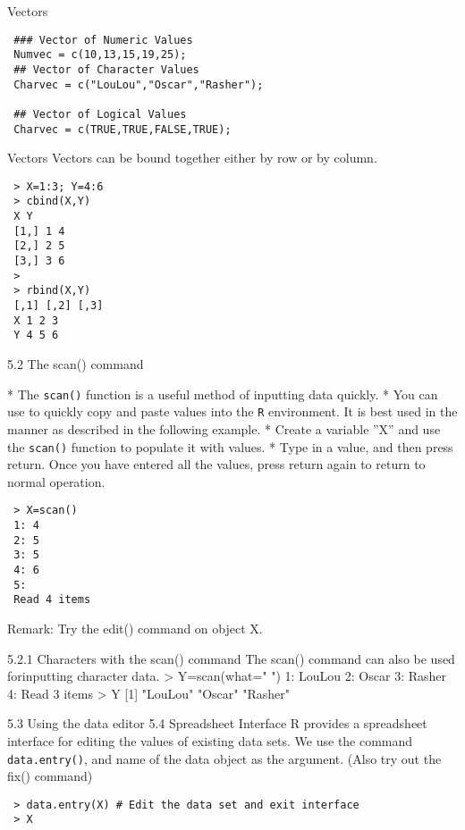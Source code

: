 \documentclass{beamer}
\begin{document}
{Vectors}
 \begin{framed}
 \begin{verbatim}
 ### Vector of Numeric Values
 Numvec = c(10,13,15,19,25);
 ## Vector of Character Values
 Charvec = c("LouLou","Oscar","Rasher");
 
 ## Vector of Logical Values
 Charvec = c(TRUE,TRUE,FALSE,TRUE);
 \end{verbatim}
 \end{framed}
 
 
{Vectors}
 Vectors can be bound together either by row or by column.
 \begin{framed}
 \begin{verbatim}
 > X=1:3; Y=4:6
 > cbind(X,Y)
 X Y
 [1,] 1 4
 [2,] 2 5
 [3,] 3 6
 >
 > rbind(X,Y)
 [,1] [,2] [,3]
 X 1 2 3
 Y 4 5 6
 \end{verbatim}
 \end{framed}
 
 
{5.2 The scan() command}
 
 * The \texttt{scan()} function is a useful method of inputting data quickly. 
 *  You can use to quickly copy
 and paste values into the \texttt{R} environment. It is best used in the manner as described in the
 following example. 
 *  Create a variable ”X” and use the \texttt{scan()} function to populate it with
 values. 
 *  Type in a value, and then press return. Once you have entered all the values, press
 return again to return to normal operation.

 
 
 \begin{verbatim}
 > X=scan()
 1: 4
 2: 5
 3: 5
 4: 6
 5:
 Read 4 items
 \end{verbatim}
 Remark: Try the edit() command on object X.
 
 
 5.2.1 Characters with the scan() command
 The scan() command can also be used forinputting character data.
 > Y=scan(what=" ")
 1: LouLou
 2: Oscar
 3: Rasher
 4:
 Read 3 items
 > Y
 [1] "LouLou" "Oscar" "Rasher"
 
 
 5.3 Using the data editor
 5.4 Spreadsheet Interface
 R provides a spreadsheet interface for editing the values of existing data sets. We use the
 command \texttt{data.entry()}, and name of the data object as the argument. (Also try out the
 fix() command)
 \begin{framed}
 \begin{verbatim}
 > data.entry(X) # Edit the data set and exit interface
 > X
 \end{verbatim}
 \end{framed}
 
 
 
 
\end{document}
